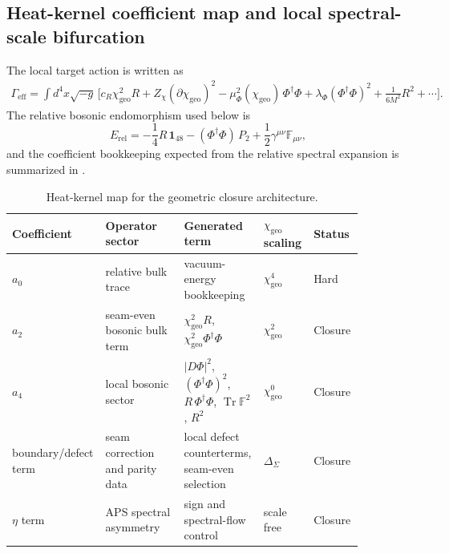 \documentclass[11pt,a4paper]{article}
\theoremstyle{definition}
\theoremstyle{remark}
\DeclareMathOperator{\tr}{Tr}
\newcommand{\Seam}{\Sigma}
\newcommand{\Gammaeff}{\Gamma_{\mathrm{eff}}}
\newcommand{\chigeo}{\chi_{\mathrm{geo}}}
\begin{document}
\subsection{Heat-kernel coefficient map and local spectral-scale bifurcation}

The local target action is written as
\begin{equation}
\label{eq:chi-effective-action}
\begin{aligned}
\Gammaeff
=
\int d^4x\sqrt{-g}\,
\Big[
c_R\chigeo^2R
+Z_\chi(\partial\chigeo)^2
-\mu_\Phi^2(\chigeo)\,\Phi^\dagger\Phi
+\lambda_\Phi(\Phi^\dagger\Phi)^2
+\frac{1}{6M^2}R^2
+\cdots
\Big].
\end{aligned}
\end{equation}
The relative bosonic endomorphism used below is
\begin{equation}
\label{eq:relative-bosonic-endomorphism}
E_{\mathrm{rel}}
=
-\frac14 R\,\mathbf 1_{48}
-
(\Phi^\dagger\Phi)\,P_2
+
\frac12\gamma^{\mu\nu}\mathbb F_{\mu\nu},
\end{equation}
and the coefficient bookkeeping expected from the relative spectral expansion is summarized in .

\begin{table}[t]
\centering
\small
\begin{tabularx}{\linewidth}{@{}>{\raggedright\arraybackslash}p{0.15\linewidth}>{\raggedright\arraybackslash}p{0.22\linewidth}>{\raggedright\arraybackslash}p{0.22\linewidth}>{\raggedright\arraybackslash}p{0.14\linewidth}>{\raggedright\arraybackslash}p{0.14\linewidth}@{}}
\toprule
Coefficient & Operator sector & Generated term & $\chigeo$ scaling & Status \\
\midrule
$a_0$ & relative bulk trace & vacuum-energy bookkeeping & $\chigeo^4$ & Hard \\
$a_2$ & seam-even bosonic bulk term & $\chigeo^2R$, $\chigeo^2\Phi^\dagger\Phi$ & $\chigeo^2$ & Closure \\
$a_4$ & local bosonic sector & $|D\Phi|^2$, $(\Phi^\dagger\Phi)^2$, $R\,\Phi^\dagger\Phi$, $\tr\mathbb F^2$, $R^2$ & $\chigeo^0$ & Closure \\
boundary/defect term & seam correction and parity data & local defect counterterms, seam-even selection & $\Delta_{\Seam}$ & Closure \\
$\eta$ term & APS spectral asymmetry & sign and spectral-flow control & scale free & Closure \\
\bottomrule
\end{tabularx}
\caption{Heat-kernel map for the geometric closure architecture.}
\label{tab:heat-kernel-map}
\end{table}
\end{document}
